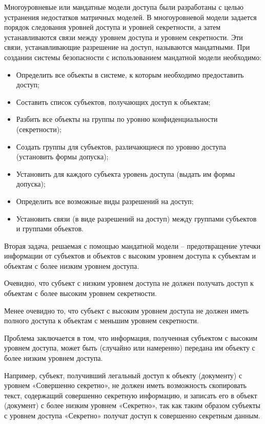 Многоуровневые или мандатные модели доступа были разработаны с целью устранения недостатков матричных моделей.
В многоуровневой модели задается порядок следования уровней доступа и уровней секретности, а затем устанавливаются связи между уровнем доступа и уровнем секретности.
Эти связи, устанавливающие разрешение на доступ, называются мандатными.
При создании системы безопасности с использованием мандатной модели необходимо:
\begin{itemize}
    \item Определить все объекты в системе, к которым необходимо предоставить доступ;
    \item Составить список субъектов, получающих доступ к объектам;
    \item Разбить все объекты на группы по уровню конфиденциальности (секретности);
    \item Создать группы для субъектов, различающиеся по уровню доступа (установить формы допуска);
    \item Установить для каждого субъекта уровень доступа (выдать им формы допуска);
    \item Определить все возможные виды разрешений на доступ;
    \item Установить связи (в виде разрешений на доступ) между группами субъектов и группами объектов.
\end{itemize}
Вторая задача, решаемая с помощью мандатной модели – предотвращение утечки информации от субъектов и объектов с высоким уровнем доступа к субъектам и объектам с более низким уровнем доступа.

Очевидно, что субъект с низким уровнем доступа не должен получать
доступ к объектам с более высоким уровнем секретности.

Менее очевидно то, что субъект с высоким уровнем доступа не должен иметь полного доступа к объектам с меньшим уровнем секретности.

Проблема заключается в том, что информация, полученная субъектом с высоким уровнем доступа, может быть (случайно или намеренно) передана им объекту с более низким уровнем доступа.

Например, субъект, получивший легальный доступ к объекту (документу) с уровнем «Совершенно секретно», не должен иметь возможность скопировать текст, содержащий совершенно секретную информацию, и записать его в объект (документ) с более низким уровнем «Секретно», так как таким образом субъекты с уровнем доступа «Секретно» получат доступ к совершенно секретным данным. 


